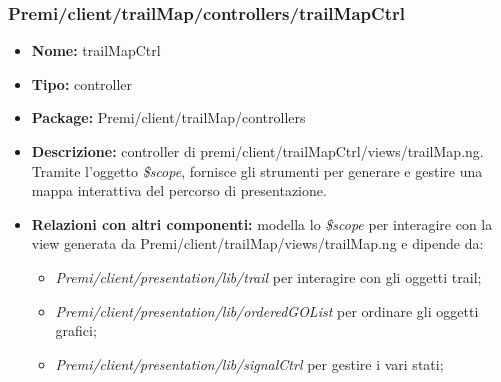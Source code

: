 \subsubsection{Premi/client/trailMap/controllers/trailMapCtrl}
\begin{itemize}
  \item[] \textbf{Nome:} trailMapCtrl
  \item[] \textbf{Tipo:} controller
  \item[] \textbf{Package:} Premi/client/trailMap/controllers
  \item[] \textbf{Descrizione:} controller di premi/client/trailMapCtrl/views/trailMap.ng. Tramite l'oggetto \textit{\$scope}, fornisce gli strumenti per generare e gestire una mappa interattiva del percorso di presentazione.
  \item[] \textbf{Relazioni con altri componenti:} modella lo \textit{\$scope} per interagire con la view generata da Premi/client/trailMap/views/trailMap.ng e dipende da:
  \begin{itemize}
  	\item \textit{Premi/client/presentation/lib/trail} per interagire con gli oggetti trail;
  	\item \textit{Premi/client/presentation/lib/orderedGOList} per ordinare gli oggetti grafici;
  	\item \textit{Premi/client/presentation/lib/signalCtrl} per gestire i vari stati;
  \end{itemize}
\end{itemize}
















